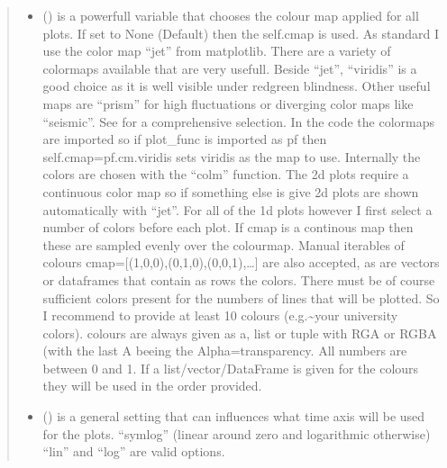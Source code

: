 \documentclass[letterpaper,10pt,english]{sphinxmanual}
\begin{document}
\begin{fulllineitems}
\begin{fulllineitems}
\begin{quote}
\begin{description}
\begin{itemize}
\item {} 
 (\sphinxstyleliteralemphasis{\sphinxupquote{, }}) \textendash{} is a powerfull variable that chooses the colour map applied for all plots. If set to
None (Default) then the self.cmap is used.
As standard I use the color map “jet” from matplotlib. There are a variety of colormaps
available that are very usefull. Beside “jet”, “viridis” is a good choice as it is well
visible under red\sphinxhyphen{}green blindness. Other useful maps are “prism” for high fluctuations
or diverging color maps like “seismic”.
See  for a comprehensive
selection. In the code the colormaps are imported so if plot\_func is imported as pf then
self.cmap=pf.cm.viridis sets viridis as the map to use. Internally the colors are chosen
with the “colm” function. The 2d plots require a continuous color map so if something
else is give 2d plots are shown automatically with “jet”. For all of the 1d plots however
I first select a number of colors before each plot. If cmap is a continous map then these
are sampled evenly over the colourmap. Manual iterables of colours
cmap={[}(1,0,0),(0,1,0),(0,0,1),…{]} are also accepted, as are vectors or dataframes that
contain as rows the colors. There must be of course sufficient colors present for
the numbers of lines that will be plotted. So I recommend to provide at least 10 colours
(e.g.\textasciitilde{}your university colors). colours are always given as a, list or tuple with RGA or RGBA
(with the last A beeing the Alpha=transparency. All numbers are between 0 and 1.
If a list/vector/DataFrame is given for the colours they will be used in the order provided.

\item {} 
 () \textendash{} is a general setting that can influences what time axis will be used for the plots.
“symlog” (linear around zero and logarithmic otherwise) “lin” and “log” are valid options.

\end{itemize}

\end{description}\end{quote}

\end{fulllineitems}
\end{fulllineitems}
\end{document}
